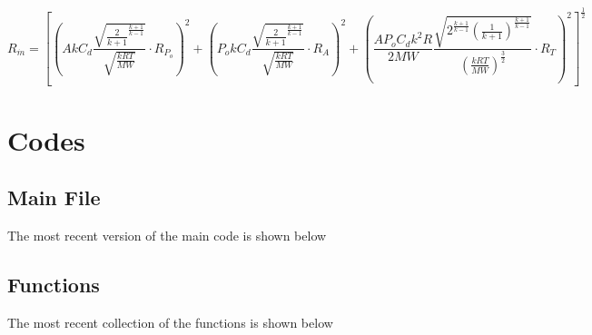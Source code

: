\documentclass{article}
\newcommand{\dps }{ A k C_{d} \frac{\sqrt{\frac{2}{k+1}^{\frac{k+1}{k-1}}}}{\sqrt{\frac{kRT}{MW}}}}
\newcommand{\das}{P_o k C_{d} \frac{\sqrt{\frac{2}{k+1}^{\frac{k+1}{k-1}}}}{\sqrt{\frac{kRT}{MW}}}}
\newcommand{\dts}{ \frac{ A P_o C_{d} k^2 R}{2MW}
\frac{ \sqrt{2^{\frac{k+1}{k-1}}\left(\frac{1}{k+1}\right)^{\frac{k+1}{k-1}}}}
{\left(\frac{kRT}{MW}\right)^{\frac{3}{2}}}}
\begin{document}
        \[
            R_{\dot{m}}=\left[\left(\dps\cdot R_{P_{o}}\right) ^2 + \left(\das \cdot R_A \right) ^2 +\left( \dts \cdot R_T \right) ^2 \right]^{\frac{1}{2}}
        \]
\section{Codes}
    \subsection{Main File}
        The most recent version of the main code is shown below
            
    \subsection{Functions}
         The most recent collection of the functions is shown below
            


\end{document}
